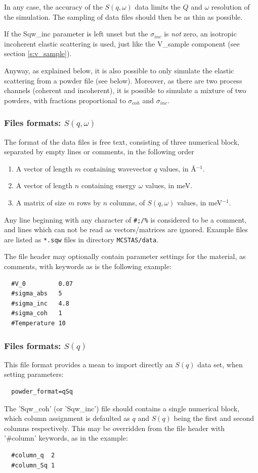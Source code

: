 In any case, the accuracy of the $S(q, \omega)$ data limits the $Q$ and $\omega$ resolution of the simulation. The sampling of data files should then be as thin as possible.

If the Sqw\_inc parameter is left unset but the $\sigma_{inc}$ is \emph{not} zero, an isotropic incoherent elastic scattering is used, just like the V\_sample component (see section \ref{s:v_sample}).

Anyway, as explained below, it is also possible to only simulate the elastic scattering from a powder file (see below). Moreover, as there are two process channels (coherent and incoherent), it is possible to simulate a mixture of two powders, with fractions proportional to $\sigma_{coh}$ and $\sigma_{inc}$.

\subsubsection{Files formats: $S(q,\omega)$}

The format of the data files is free text, consisting of three numerical block, separated by empty lines or comments, in the following order
\begin{enumerate}
\item A vector of length $m$ containing wavevector $q$ values, in \AA$^{-1}$.
\item A vector of length $n$ containing energy $\omega$ values, in meV.
\item A matrix of size $m$ rows by $n$ columns, of $S(q, \omega)$ values, in meV$^{-1}$.
\end{enumerate}
Any line beginning with any character of \verb+#;/%+ is considered to be a comment, and lines which can not be read as vectors/matrices are ignored.
Example files are listed as \verb+*.sqw+ files in directory \verb+MCSTAS/data+.

The file header may optionally contain parameter settings for the material, as comments, with keywords as is the following example:
\begin{verbatim}
  #V_0         0.07
  #sigma_abs   5
  #sigma_inc   4.8
  #sigma_coh   1
  #Temperature 10
\end{verbatim}

\subsubsection{Files formats: $S(q)$}

This file format provides a mean to import directly an $S(q)$ data set, when setting parameters:
\begin{verbatim}
  powder_format=qSq
\end{verbatim}
The 'Sqw\_coh' (or 'Sqw\_inc') file should contains a single numerical block, which column assignment is defaulted as $q$ and $S(q)$ being the first and second columns respectively. This may be overridden from the file header with '\#column' keywords, as in the example:
\begin{verbatim}
  #column_q  2
  #column_Sq 1
\end{verbatim}

